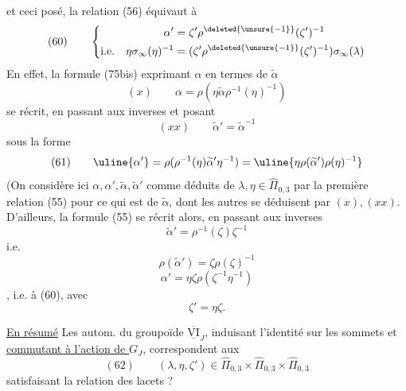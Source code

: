 et ceci posé, la relation (56) équivaut à
\[
(60)\qquad\left\{\begin{aligned}
\alpha'&=\zeta'\rho^{\deleted{\unsure{-1}}}(\zeta')^{-1}\\
\text{i.e.}\quad\eta\sigma_\infty(\eta)^{-1}&=(\zeta'\rho^{\deleted{\unsure{-1}}}(\zeta')^{-1})\sigma_\infty(\lambda)
\end{aligned}\right.
\]
\quad{}
En effet, la formule (75bis) exprimant $\alpha$ en termes de $\widetilde\alpha$
\[
(x)\qquad\alpha=\rho(\eta\widetilde\alpha\rho^{-1}(\eta)^{-1})
\]
se récrit, en passant aux inverses et posant
\[
(xx)\qquad\widetilde\alpha'=\widetilde\alpha^{-1}
\]
sous la forme
\[
(61)\qquad\uline{\alpha'}=\rho(\rho^{-1}(\eta)\widetilde\alpha'\eta^{-1})
=\uline{\eta\rho(\widetilde\alpha')\rho(\eta)^{-1}}
\]
(On considère ici $\alpha,\alpha',\widetilde\alpha,\widetilde\alpha'$ comme déduits de $\lambda,\eta\in\widehat\Pi_{0,3}$ par la première relation (55) pour ce qui est de $\widetilde\alpha$, dont les autres se déduisent par $(x),(xx)$. D'ailleurs, la  formule (55) se récrit alors, en passant aux inverses
\[
\widetilde\alpha'=\rho^{-1}(\zeta)\zeta^{-1}
\]
i.e.
\[
\rho(\widetilde\alpha')=\zeta\rho(\zeta)^{-1}
\]
 
\[
\alpha'=\eta\zeta\rho(\zeta^{-1}\eta^{-1})
\]
,
i.e. à (60), avec
\[
\zeta'=\eta\zeta.
\]

\uline{En résumé} Les autom. du groupoïde $\overline{\underline{\mathrm{VI}}}_J$, induisant l'identité sur les sommets et \uline{commutant à l'action de $G_J$}, correspondent aux
\[
(62)\qquad\boxed{(\lambda,\eta,\zeta')\in\widehat\Pi_{0,3}\times\widehat\Pi_{0,3}\times\widehat\Pi_{0,3}}
\]
satisfaisant la relation des lacets ?

